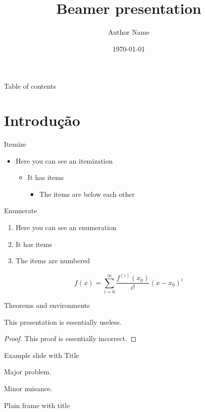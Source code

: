 \documentclass[smaller,professionalfonts]{beamer}
\author{Author Name}
\title{Beamer presentation}
\institute{Pázmány Péter Catholic University}
\date{\today}
\begin{document}
\frame{\maketitle}
\begin{frame}{Table of contents}
	\tableofcontents
\end{frame}

\section{Introdução}
\begin{frame}{Itemize}
\begin{itemize}
\item Here you can see an itemization
\begin{itemize}
\item It has items
\begin{itemize}
\item The items are below each other
\end{itemize}
\end{itemize}
\end{itemize}
\end{frame}

\begin{frame}{Enumerate}
\begin{enumerate}
\item Here you can see an enumeration
\item It has items
\item The items are numbered
\end{enumerate}
\[
	f(x)=\sum_{i=0}^\infty \frac{f^{(i)}(x_0)}{i!}(x-x_0)^i
\]
\end{frame}

\begin{frame}{Theorems and environments}
\begin{theorem}
This presentation is essentially useless.
\end{theorem}
\begin{proof}
This proof is essentially incorrect.
\end{proof}
\end{frame}

\begin{frame}{Example slide with Title}
\begin{example}
Major problem.
\end{example}
\begin{solution}
Minor nuisance.
\end{solution}
\end{frame}

\begin{frame}[plain]{Plain frame with title}
\lipsum[1]
\end{frame}
\end{document}

